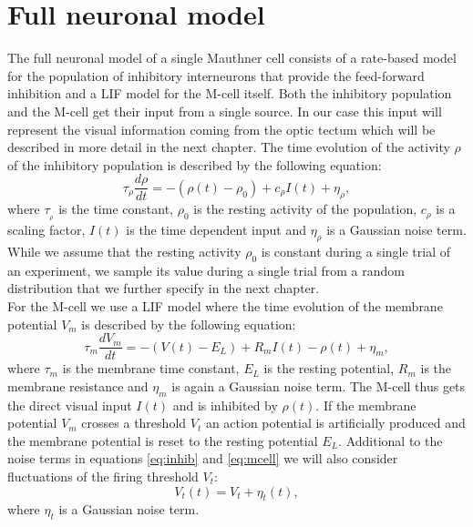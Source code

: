 \documentclass[a4paper,10pt,hidelinks]{scrreprt}
\begin{document}
	\section{Full neuronal model}
	The full neuronal model of a single Mauthner cell consists of a rate-based model for the 
	population of inhibitory interneurons that provide the feed-forward inhibition and a LIF model 
	for the M-cell itself.
	Both the inhibitory population and the M-cell get their input from a single source.
	In our case this input will represent the visual information coming from the optic tectum which 
	will be described in more detail in the next chapter.
	The time evolution of the activity $\rho$ of the inhibitory population is described by the 
	following equation:
	\begin{equation}
	\tau _{\rho} \frac{d\rho}{dt} = - (\rho(t) - \rho_{0}) + c_{\rho} I(t) + 
	\eta _{\rho},
	\label{eq:inhib}
	\end{equation}
	where $\tau _{_\rho}$ is the time constant, $\rho _{0}$ is the resting activity of the 
	population, $c_{\rho}$ is a scaling factor, $I(t)$ is the time dependent input and $\eta 
	_{\rho}$ is a Gaussian noise term.
    While we assume that the resting activity $\rho_{0}$ is constant during a single trial of an experiment, we sample its value during a single trial from a random distribution that we further specify in the next chapter.\\
	For the M-cell we use a LIF model where the time evolution of the membrane potential $V_m$ is 
	described by the following equation:
	\begin{equation}
	\tau _m \frac{dV_m}{dt} = - (V(t) - E_{L}) + R_{m} I(t) - \rho (t) +  \eta 
	_m,
	\label{eq:mcell}
	\end{equation}
	where $\tau_{m}$ is the membrane time constant, $E_L$ is the resting potential, $R_m$ is the 
	membrane resistance and $\eta_{m}$ is again a Gaussian noise term.
	The M-cell thus gets the direct visual input $I(t)$ and is inhibited by $\rho(t)$.
	If the membrane potential $V_m$ crosses a threshold $V_t$ an action potential is artificially 
	produced and the membrane potential is reset to the resting potential $E_L$.
	Additional to the noise terms in equations \ref{eq:inhib} and \ref{eq:mcell} we will also 
	consider fluctuations of the firing threshold $V_t$:
	\begin{equation}
	V_t (t) = V_t + \eta_t(t),
	\label{eq:thrs}
	\end{equation}
	where $\eta_t$ is a Gaussian noise term.\\
\end{document}

